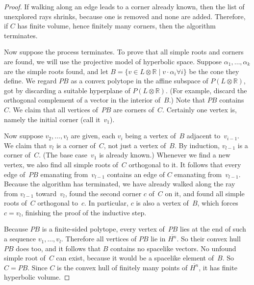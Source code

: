 \documentclass[12pt]{amsart}
\def\R{\mathbb{R}}
\def\tensor{\otimes}
\def\set#1#2{\{#1\mathbin|#2\}}
\numberwithin{theorem}{section}
\numberwithin{equation}{section}
\numberwithin{figure}{section}
\theoremstyle{remark}
\begin{document}
\begin{proof}
    If walking along an edge leads to a corner already known,
    then the list of unexplored rays shrinks, because one is
    removed and none are added.   
    Therefore, if $C$ has 
    finite volume, hence finitely many corners, then the
    algorithm terminates.
    
    Now suppose the process terminates.
    To prove that all simple roots and corners are
    found, we will use the projective
    model of hyperbolic space.  Suppose $\alpha_1,\dots,\alpha_k$
    are the simple roots found, 
    and let $B=\set{v\in L\tensor\R}{v\cdot\alpha_i\forall i}$
    be the cone they define.  We regard $PB$ as a 
    convex polytope  in the affine subspace of $P(L\tensor\R)$,
    got by discarding a suitable hyperplane of $P(L\tensor\R)$.
    (For example, discard the  orthogonal complement of
    a vector in the interior of~$B$.)  Note that $PB$ contains~$C$.
    We claim that 
    all vertices of~$PB$ are corners of~$C$.  Certainly
    one vertex is, namely the initial corner (call it~$v_1$).

    Now suppose  $v_2,\dots,v_l$ are given,  each $v_i$ being a
    vertex of~$B$ adjacent to~$v_{i-1}$. We claim that $v_l$ is a corner
    of~$C$, not just a vertex of~$B$.  
    By induction, $v_{l-1}$ is a corner of~$C$.  
    (The base case~$v_1$ is already known.)
    Whenever
    we find a new vertex, we also find all simple roots of~$C$
    orthogonal to it.  It follows that  every edge of~$PB$
    emanating from~$v_{l-1}$ contains an edge of $C$ emanating
    from~$v_{l-1}$.
    Because the algorithm has terminated, we have already 
    walked along the ray from $v_{l-1}$  toward~$v_l$, 
    found the second corner $c$ of~$C$
    on it, and found all simple roots of~$C$
    orthogonal to~$c$.  In particular, $c$ is also
    a vertex of~$B$, which forces $c=v_l$, finishing the proof
    of the inductive step.

    Because $PB$ is a finite-sided polytope, every vertex of~$PB$
    lies at the end of such a sequence $v_1,\dots,v_l$.
    Therefore all vertices of 
    $PB$
    lie in $\overline{H^n}$.  So their convex hull $PB$ does too, and
    it follows that $B$ contains no spacelike vectors.  No unfound simple
    root of~$C$ can exist, because it would be a spacelike element of~$B$.
    So $C=PB$.  Since $C$ is the convex hull of finitely many points of
    $\overline{H^n}$, it has finite hyperbolic volume.
\end{proof}
\end{document}
